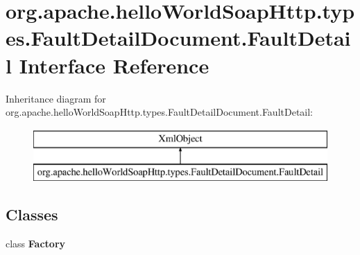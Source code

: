 \hypertarget{interfaceorg_1_1apache_1_1hello_world_soap_http_1_1types_1_1_fault_detail_document_1_1_fault_detail}{}\section{org.\+apache.\+hello\+World\+Soap\+Http.\+types.\+Fault\+Detail\+Document.\+Fault\+Detail Interface Reference}
\label{interfaceorg_1_1apache_1_1hello_world_soap_http_1_1types_1_1_fault_detail_document_1_1_fault_detail}
Inheritance diagram for org.\+apache.\+hello\+World\+Soap\+Http.\+types.\+Fault\+Detail\+Document.\+Fault\+Detail\+:\begin{figure}[H]
\begin{center}
\leavevmode
\includegraphics[height=2.000000cm]{interfaceorg_1_1apache_1_1hello_world_soap_http_1_1types_1_1_fault_detail_document_1_1_fault_detail}
\end{center}
\end{figure}
\subsection*{Classes}
\begin{DoxyCompactItemize}
\item 
class {\bfseries Factory}
\end{DoxyCompactItemize}
